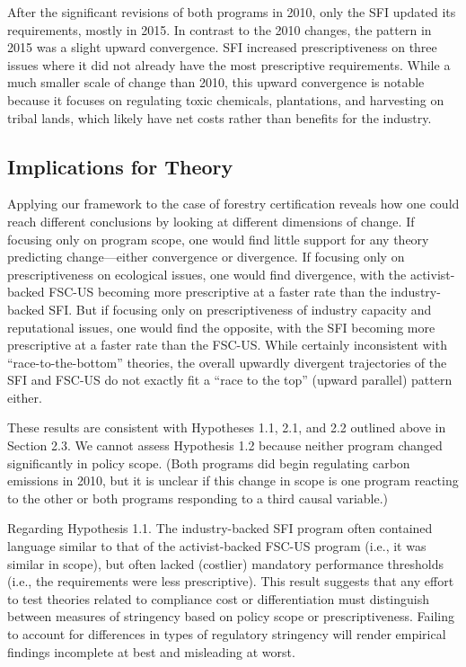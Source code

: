 \documentclass[
      12pt,
            Review ]{article}
\begin{document}
After the significant revisions of both programs in 2010, only the SFI updated its requirements, mostly in 2015. In contrast to the 2010 changes, the pattern in 2015 was a slight upward convergence. SFI increased prescriptiveness on three issues where it did not already have the most prescriptive requirements. While a much smaller scale of change than 2010, this upward convergence is notable because it focuses on regulating toxic chemicals, plantations, and harvesting on tribal lands, which likely have net costs rather than benefits for the industry.

\hypertarget{implications-for-theory}{%
\subsection{Implications for Theory}\label{implications-for-theory}}

Applying our framework to the case of forestry certification reveals how one could reach different conclusions by looking at different dimensions of change. If focusing only on program scope, one would find little support for any theory predicting change---either convergence or divergence. If focusing only on prescriptiveness on ecological issues, one would find divergence, with the activist-backed FSC-US becoming more prescriptive at a faster rate than the industry-backed SFI. But if focusing only on prescriptiveness of industry capacity and reputational issues, one would find the opposite, with the SFI becoming more prescriptive at a faster rate than the FSC-US. While certainly inconsistent with ``race-to-the-bottom'' theories, the overall upwardly divergent trajectories of the SFI and FSC-US do not exactly fit a ``race to the top'' (upward parallel) pattern either.

These results are consistent with Hypotheses 1.1, 2.1, and 2.2 outlined above in Section 2.3. We cannot assess Hypothesis 1.2 because neither program changed significantly in policy scope. (Both programs did begin regulating carbon emissions in 2010, but it is unclear if this change in scope is one program reacting to the other or both programs responding to a third causal variable.)

Regarding Hypothesis 1.1. The industry-backed SFI program often contained language similar to that of the activist-backed FSC-US program (i.e., it was similar in scope), but often lacked (costlier) mandatory performance thresholds (i.e., the requirements were less prescriptive). This result suggests that any effort to test theories related to compliance cost or differentiation must distinguish between measures of stringency based on policy scope or prescriptiveness. Failing to account for differences in types of regulatory stringency will render empirical findings incomplete at best and misleading at worst.
\end{document}
